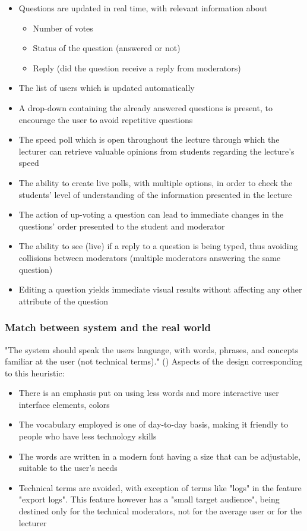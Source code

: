 \documentclass{article}
\begin{document}
\begin{itemize}
    \item Questions are updated in real time, with relevant information about
    \begin{itemize}
        \item Number of votes
        \item Status of the question (answered or not)
        \item Reply (did the question receive a reply from moderators)
    \end{itemize}
    \item The list of users which is updated automatically 
    \item A drop-down containing the already answered questions is present, to encourage the user to avoid repetitive questions
    \item The speed poll which is open throughout the lecture through which the lecturer can retrieve valuable opinions from students regarding the lecture's speed
    \item The ability to create live polls, with multiple options, in order to check the students' level of understanding of the information presented in the lecture
    \item The action of up-voting a question can lead to immediate changes in the questions' order presented to the student and moderator
    \item The ability to see (live) if a reply to a question is being typed, thus avoiding collisions between moderators (multiple moderators answering the same question)
    \item Editing a question yields immediate visual results without affecting any other attribute of the question
\end{itemize}


\subsubsection{Match between system and the real world\label{2ndheuristic}}
"The system should speak the users language, with words, phrases, and concepts familiar at the user (not technical terms)." (\textcite{Nielsen1994})
Aspects of the design corresponding to this heuristic:
\begin{itemize}
    \item There is an emphasis put on using less words and more interactive user interface elements, colors  
    \item The vocabulary employed is one of day-to-day basis, making it friendly to people who have less technology skills
    \item The words are written in a modern font having a size that can be adjustable, suitable to the user's needs
    \item Technical terms are avoided, with exception of terms like "logs" in the feature "export logs". This feature however has a "small target audience", being destined only for the technical moderators, not for the average user or for the lecturer
\end{itemize}
\end{document}
